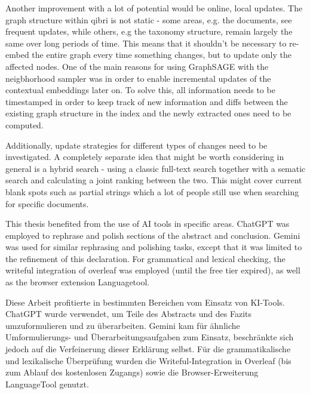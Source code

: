 \documentclass[draft,final]{vutinfth} %
\begin{document}
Another improvement with a lot of potential would be online, local updates. The graph structure within qibri is not static - some areas, e.g. the documents, see frequent updates, while others, e.g the taxonomy structure, remain largely the same over long periods of time. This means that it shouldn't be necessary to re-embed the entire graph every time something changes, but to update only the affected nodes. One of the main reasons for using GraphSAGE with the neigbhorhood sampler was in order to enable incremental updates of the contextual embeddings later on. To solve this, all information needs to be timestamped in order to keep track of new information and diffs between the existing graph structure in the index and the newly extracted ones need to be computed.

Additionally, update strategies for different types of changes need to be investigated. A completely separate idea that might be worth considering in general is a hybrid search - using a classic full-text search together with a sematic search and calculating a joint ranking between the two. This might cover current blank spots such as partial strings which a lot of people still use when searching for specific documents.



\backmatter

\begin{aitools}
This thesis benefited from the use of AI tools in specific areas. ChatGPT was employed to rephrase and polish sections of the abstract and conclusion. Gemini was used for similar rephrasing and polishing tasks, except that it was limited to the refinement of this declaration. For grammatical and lexical checking, the writeful integration of overleaf was employed (until the free tier expired), as well as the browser extension Languagetool.
\end{aitools}

\begin{kitools}
Diese Arbeit profitierte in bestimmten Bereichen vom Einsatz von KI-Tools. ChatGPT wurde verwendet, um Teile des Abstracts und des Fazits umzuformulieren und zu überarbeiten. Gemini kam für ähnliche Umformulierungs- und Überarbeitungsaufgaben zum Einsatz, beschränkte sich jedoch auf die Verfeinerung dieser Erklärung selbst. Für die grammatikalische und lexikalische Überprüfung wurden die Writeful-Integration in Overleaf (bis zum Ablauf des kostenlosen Zugangs) sowie die Browser-Erweiterung LanguageTool genutzt.
\end{kitools}
\end{document}
